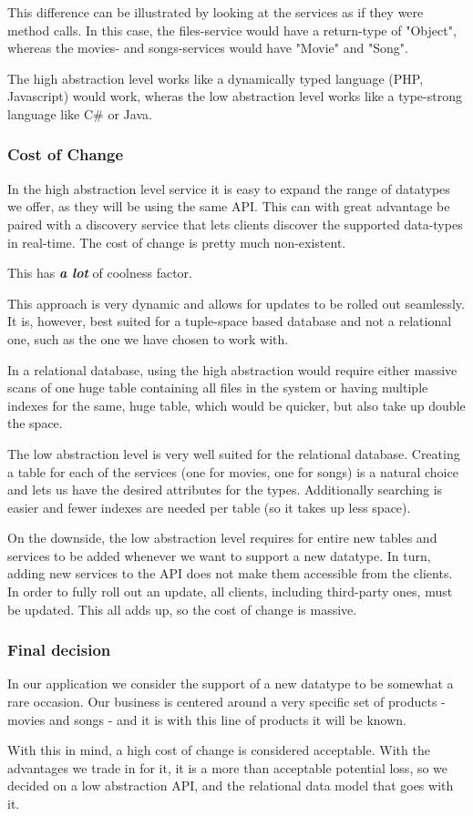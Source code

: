 This difference can be illustrated by looking at the services as if they were method calls.
In this case, the files-service would have a return-type of "Object", whereas the movies-
and songs-services would have "Movie" and "Song".

The high abstraction level works like a dynamically typed language (PHP, Javascript) would
work, wheras the low abstraction level works like a type-strong language like C\# or Java.

\subsubsection{Cost of Change}
In the high abstraction level service it is easy to expand the range of datatypes we offer,
as they will be using the same API. This can with great advantage be paired with a discovery
service that lets clients discover the supported data-types in real-time. The cost of change
is pretty much non-existent.

This has \textbf{\emph{a lot}} of coolness factor.

This approach is very dynamic and allows for updates to be rolled out seamlessly. It is, however,
best suited for a tuple-space based database and not a relational one, such as the one we have
chosen to work with.

In a relational database, using the high abstraction would require either massive scans of one
huge table containing all files in the system or having multiple indexes for the same, huge table,
which would be quicker, but also take up double the space.

The low abstraction level is very well suited for the relational database. Creating a table for each
of the services (one for movies, one for songs) is a natural choice and lets us have the desired
attributes for the types. Additionally searching is easier and fewer indexes are needed per table
(so it takes up less space).

On the downside, the low abstraction level requires for entire new tables and services to be added
whenever we want to support a new datatype. In turn, adding new services to the API does not make
them accessible from the clients. In order to fully roll out an update, all clients,
including third-party ones, must be updated. This all adds up, so the cost of change is massive.

\subsubsection{Final decision}
In our application we consider the support of a new datatype to be somewhat a rare occasion. Our
business is centered around a very specific set of products - movies and songs - and it is with
this line of products it will be known.

With this in mind, a high cost of change is considered acceptable. With the advantages we trade in for
it, it is a more than acceptable potential loss, so we decided on a low abstraction API, and the relational
data model that goes with it.
